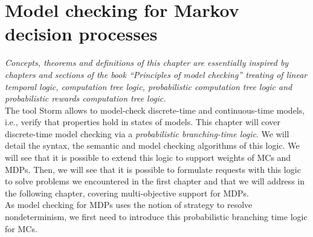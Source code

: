 \chapter{Model checking for Markov decision processes}

\textit{Concepts, theorems and definitions of this chapter are essentially inspired by chapters and sections of the book ``Principles of model checking'' \cite{PMC} treating of linear temporal logic, computation tree logic, probabilistic computation tree logic and probabilistic rewards computation tree logic.}\\

The tool Storm allows to model-check discrete-time and continuous-time models, i.e.,
verify that properties hold in states of models. This
chapter will cover discrete-time model checking via a \textit{probabilistic branching-time logic}. We will detail the syntax, the semantic and model checking algorithms of this logic.
We will see that it is possible to extend this logic to support weights of MCs and MDPs. Then, we will see that it is
possible to formulate requests with this logic to solve
problems we encountered in the first chapter and that we
will address in the following chapter, covering multi-objective support for MDPs. \\

As model checking for MDPs uses the notion of strategy to resolve nondeterminism,
we first need to introduce this probabilistic branching time logic for MCs.

